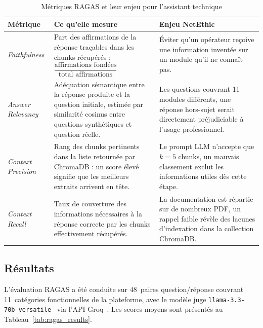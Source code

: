\vspace{6pt}
\begin{table}[H]
\centering
\caption{Métriques RAGAS et leur enjeu pour l'assistant technique}
\label{tab:ragas_metrics}
\begin{tabular}{|p{3.2cm}|p{5.5cm}|p{5cm}|}
\hline
\textbf{Métrique} & \textbf{Ce qu'elle mesure} & \textbf{Enjeu NetEthic} \\
\hline
\emph{Faithfulness} &
  Part des affirmations de la réponse traçables dans les chunks récupérés :
  $\dfrac{\text{affirmations fondées}}{\text{total affirmations}}$ &
  Éviter qu'un opérateur reçoive une information inventée sur un module qu'il ne connaît pas. \\
\hline
\emph{Answer Relevancy} &
  Adéquation sémantique entre la réponse produite et la question initiale,
  estimée par similarité cosinus entre questions synthétiques et question réelle. &
  Les questions couvrant 11 modules différents, une réponse hors-sujet
  serait directement préjudiciable à l'usage professionnel. \\
\hline
\emph{Context Precision} &
  Rang des chunks pertinents dans la liste retournée par ChromaDB :
  un score élevé signifie que les meilleurs extraits arrivent en tête. &
  Le prompt LLM n'accepte que $k=5$ chunks, un mauvais classement
  exclut les informations utiles dès cette étape. \\
\hline
\emph{Context Recall} &
  Taux de couverture des informations nécessaires à la réponse
  correcte par les chunks effectivement récupérés. &
  La documentation est répartie sur de nombreux PDF, un rappel faible
  révèle des lacunes d'indexation dans la collection ChromaDB. \\
\hline
\end{tabular}
\end{table}

\subsection{Résultats}

L'évaluation RAGAS a été conduite sur 48~paires question/réponse couvrant
11~catégories fonctionnelles de la plateforme, avec le modèle juge
\texttt{llama-3.3-70b-versatile}~\cite{llama3} via l'API Groq~\cite{groq}.
Les scores moyens sont présentés au Tableau~\ref{tab:ragas_results}.


